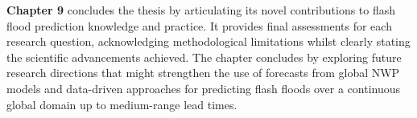 \textbf{Chapter 9}  concludes the thesis by articulating its novel contributions to flash flood prediction knowledge and practice. It provides final assessments for each research question, acknowledging methodological limitations whilst clearly stating the scientific advancements achieved. The chapter concludes by exploring future research directions that might strengthen the use of forecasts from global NWP models and data-driven approaches for predicting flash floods over a continuous global domain up to medium-range lead times. 
